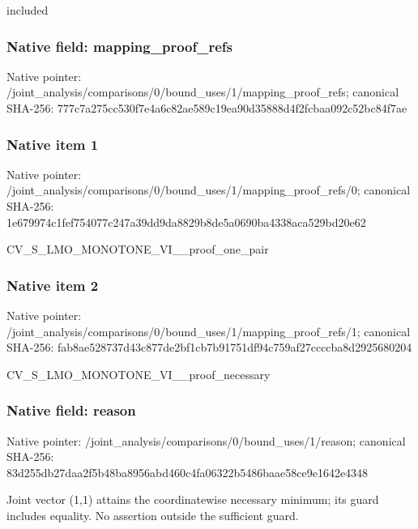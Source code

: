\documentclass[10pt,a4paper]{article}
\begin{document}
\begingroup\raggedright\sloppy included\par\endgroup

\subsubsection{Native field: mapping\_\allowbreak{}proof\_\allowbreak{}refs}
Native pointer: /joint\_\allowbreak{}analysis/comparisons/0/bound\_\allowbreak{}uses/1/mapping\_\allowbreak{}proof\_\allowbreak{}refs; canonical SHA-256: 777c7a275cc530f7e4a6c82ae589c19ea90d35888d4f2fcbaa092c52bc84f7ae

\subsubsection{Native item 1}
Native pointer: /joint\_\allowbreak{}analysis/comparisons/0/bound\_\allowbreak{}uses/1/mapping\_\allowbreak{}proof\_\allowbreak{}refs/0; canonical SHA-256: 1e679974c1fef754077c247a39dd9da8829b8de5a0690ba4338aca529bd20e62

\begingroup\raggedright\sloppy CV\_\allowbreak{}S\_\allowbreak{}LMO\_\allowbreak{}MONOTONE\_\allowbreak{}VI\_\allowbreak{}\_\allowbreak{}proof\_\allowbreak{}one\_\allowbreak{}pair\par\endgroup

\subsubsection{Native item 2}
Native pointer: /joint\_\allowbreak{}analysis/comparisons/0/bound\_\allowbreak{}uses/1/mapping\_\allowbreak{}proof\_\allowbreak{}refs/1; canonical SHA-256: fab8ae528737d43c877de2bf1cb7b91751df94c759af27ccccba8d2925680204

\begingroup\raggedright\sloppy CV\_\allowbreak{}S\_\allowbreak{}LMO\_\allowbreak{}MONOTONE\_\allowbreak{}VI\_\allowbreak{}\_\allowbreak{}proof\_\allowbreak{}necessary\par\endgroup

\subsubsection{Native field: reason}
Native pointer: /joint\_\allowbreak{}analysis/comparisons/0/bound\_\allowbreak{}uses/1/reason; canonical SHA-256: 83d255db27daa2f5b48ba8956abd460c4fa06322b5486baae58ce9e1642e4348

\begingroup\raggedright\sloppy Joint vector (1,\allowbreak{}1) attains the coordinatewise necessary minimum;\allowbreak{} its guard includes equality. No assertion outside the sufficient guard.\par\endgroup
\end{document}
